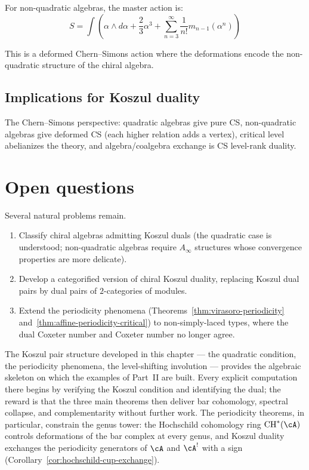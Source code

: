 For non-quadratic algebras, the master action is:
\[
S = \int \left(\alpha \wedge d\alpha + \frac{2}{3}\alpha^3 + \sum_{n=3}^{\infty} \frac{1}{n!}m_{n-1}(\alpha^n)\right)
\]

This is a deformed Chern--Simons action where the deformations encode the non-quadratic structure of the chiral algebra.

\subsection{Implications for Koszul duality}

The Chern--Simons perspective: quadratic algebras give pure CS, non-quadratic algebras give deformed CS (each higher relation adds a vertex), critical level abelianizes the theory, and algebra/coalgebra exchange is CS level-rank duality.

\section{Open questions}

Several natural problems remain.
\begin{enumerate}
\item Classify chiral algebras admitting Koszul duals (the quadratic
case is understood; non-quadratic algebras require $A_\infty$ structures
whose convergence properties are more delicate).
\item Develop a categorified version of chiral Koszul duality, replacing
Koszul dual pairs by dual pairs of $2$-categories of modules.
\item Extend the periodicity phenomena
(Theorems~\ref{thm:virasoro-periodicity}
and~\ref{thm:affine-periodicity-critical}) to non-simply-laced types,
where the dual Coxeter number and Coxeter number no longer agree.
\end{enumerate}

\medskip

The Koszul pair structure developed in this chapter --- the quadratic condition, the periodicity phenomena, the level-shifting involution --- provides the algebraic skeleton on which the examples of Part~II are built.  Every explicit computation there begins by verifying the Koszul condition and identifying the dual; the reward is that the three main theorems then deliver bar cohomology, spectral collapse, and complementarity without further work.  The periodicity theorems, in particular, constrain the genus tower: the Hochschild cohomology ring $\mathrm{CH}^*(\cA)$ controls deformations of the bar complex at every genus, and Koszul duality exchanges the periodicity generators of $\cA$ and $\cA^!$ with a sign (Corollary~\ref{cor:hochschild-cup-exchange}).
